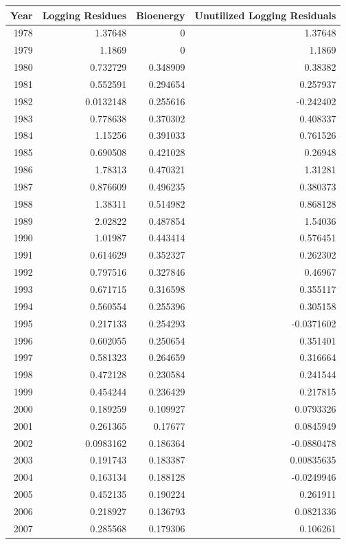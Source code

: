 \documentclass[a4paper]{article}
\begin{document}
\begin{table}[htb]
\centering
\begin{tabular}{rrrr}
Year & Logging Residues & Bioenergy & Unutilized Logging Residuals\\
\hline
1978 & 1.37648 & 0 & 1.37648\\
1979 & 1.1869 & 0 & 1.1869\\
1980 & 0.732729 & 0.348909 & 0.38382\\
1981 & 0.552591 & 0.294654 & 0.257937\\
1982 & 0.0132148 & 0.255616 & -0.242402\\
1983 & 0.778638 & 0.370302 & 0.408337\\
1984 & 1.15256 & 0.391033 & 0.761526\\
1985 & 0.690508 & 0.421028 & 0.26948\\
1986 & 1.78313 & 0.470321 & 1.31281\\
1987 & 0.876609 & 0.496235 & 0.380373\\
1988 & 1.38311 & 0.514982 & 0.868128\\
1989 & 2.02822 & 0.487854 & 1.54036\\
1990 & 1.01987 & 0.443414 & 0.576451\\
1991 & 0.614629 & 0.352327 & 0.262302\\
1992 & 0.797516 & 0.327846 & 0.46967\\
1993 & 0.671715 & 0.316598 & 0.355117\\
1994 & 0.560554 & 0.255396 & 0.305158\\
1995 & 0.217133 & 0.254293 & -0.0371602\\
1996 & 0.602055 & 0.250654 & 0.351401\\
1997 & 0.581323 & 0.264659 & 0.316664\\
1998 & 0.472128 & 0.230584 & 0.241544\\
1999 & 0.454244 & 0.236429 & 0.217815\\
2000 & 0.189259 & 0.109927 & 0.0793326\\
2001 & 0.261365 & 0.17677 & 0.0845949\\
2002 & 0.0983162 & 0.186364 & -0.0880478\\
2003 & 0.191743 & 0.183387 & 0.00835635\\
2004 & 0.163134 & 0.188128 & -0.0249946\\
2005 & 0.452135 & 0.190224 & 0.261911\\
2006 & 0.218927 & 0.136793 & 0.0821336\\
2007 & 0.285568 & 0.179306 & 0.106261\\

\end{tabular}
\end{table}
\end{document}
